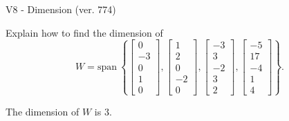 \begin{exercise}
  \begin{exerciseTitle}V8 - Dimension (ver. 774)\end{exerciseTitle}
  \begin{exerciseStatement}
    Explain how to find the dimension of 
\[W=\mathrm{span}\ \left\{\left[\begin{array}{r}
0 \\
-3 \\
0 \\
1 \\
0
\end{array}\right] , \left[\begin{array}{r}
1 \\
2 \\
0 \\
-2 \\
0
\end{array}\right] , \left[\begin{array}{r}
-3 \\
3 \\
-2 \\
3 \\
2
\end{array}\right] , \left[\begin{array}{r}
-5 \\
17 \\
-4 \\
1 \\
4
\end{array}\right]\right\}.\]



  \end{exerciseStatement}
  \begin{exerciseAnswer}
   The dimension of \(W\) is  \(3\).
  


  \end{exerciseAnswer}
\end{exercise}